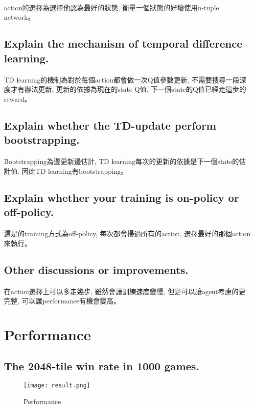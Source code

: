 \paragraph{}
action的選擇為選擇他認為最好的狀態, 衡量一個狀態的好壞使用n-tuple network。
\subsection{Explain the mechanism of temporal difference learning.}
\paragraph{}
TD learning的機制為對於每個action都會做一次Q值參數更新, 不需要搜尋一段深度才有辦法更新, 更新的依據為現在的state Q值, 下一個state的Q值已經走這步的reward。
\subsection{Explain whether the TD-update perform bootstrapping.}
\paragraph{}
Bootstrapping為邊更新邊估計, TD learning每次的更新的依據是下一個state的估計值, 因此TD learning有bootstrapping。
\subsection{Explain whether your training is on-policy or off-policy.}
\paragraph{}
這是的training方式為off-policy, 每次都會掃過所有的action, 選擇最好的那個action來執行。
\subsection{Other discussions or improvements.}
\paragraph{}
在action選擇上可以多走幾步, 雖然會讓訓練速度變慢, 但是可以讓agent考慮的更完整, 可以讓performance有機會變高。
\section{Performance}
\subsection{The 2048-tile win rate in 1000 games.}
\begin{figure}[!ht]
    \begin{center}
        \texttt{[image: result.png]}
        \caption{Performance}
    \end{center}
\end{figure}
